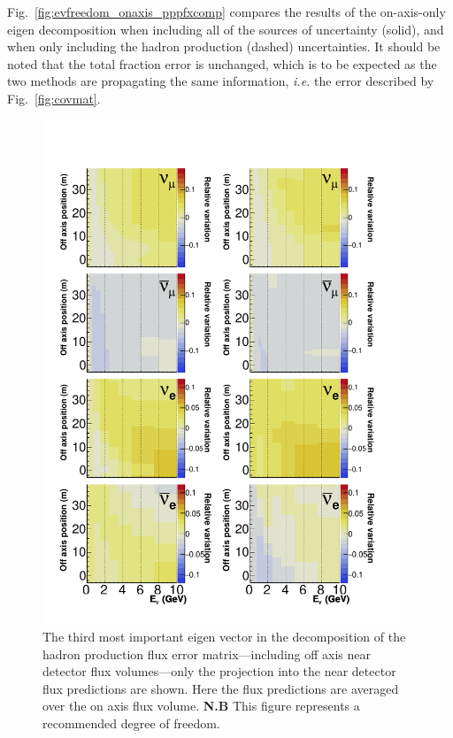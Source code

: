 \documentclass{article}
\begin{document}
 Fig.~\ref{fig:evfreedom_onaxis_pppfxcomp} compares the results of the on-axis-only eigen decomposition when including all of the sources of uncertainty (solid), and when only including the hadron production (dashed) uncertainties. It should be noted that the total fraction error is unchanged, which is to be expected as the two methods are propagating the same information, \emph{i.e.} the error described by Fig.~\ref{fig:covmat}.

\begin{figure}
  \centering
  \includegraphics[width=0.95\textwidth]{plots/EvUncerts_offaxis_component_2_ppfxonly}
  \caption{The third most important eigen vector in the decomposition of the hadron production flux error matrix---including off axis near detector flux volumes---only the projection into the near detector flux predictions are shown. Here the flux predictions are averaged over the on axis flux volume. \textbf{N.B} This figure represents a recommended degree of freedom.}
  \label{fig:evfreedom_offaxis_c2_pppfxonly}
\end{figure}
\end{document}
